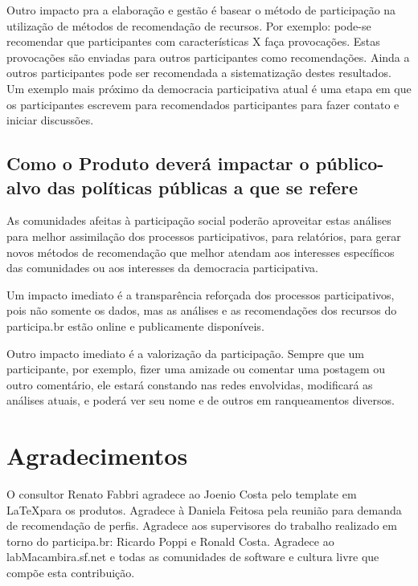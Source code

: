 \documentclass[12pt]{article}
\begin{document}
Outro impacto pra a elaboração e gestão é basear o método de participação na utilização de métodos de recomendação de recursos. Por exemplo: pode-se recomendar que participantes com características X faça provocações. Estas provocações são enviadas para outros participantes como recomendações. Ainda a outros participantes pode ser recomendada a sistematização destes resultados. Um exemplo mais próximo da democracia participativa atual é uma etapa em que os participantes escrevem para recomendados participantes para fazer contato e iniciar discussões.

\subsection{Como o Produto deverá impactar o público-alvo das políticas públicas a que se refere}
As comunidades afeitas à participação social poderão aproveitar estas análises para melhor assimilação dos processos participativos, para relatórios, para gerar novos métodos de recomendação que melhor atendam aos interesses específicos das comunidades ou aos interesses da democracia participativa.

Um impacto imediato é a transparência reforçada dos processos participativos, pois não somente os dados, mas as análises e as recomendações dos recursos do participa.br estão online e publicamente disponíveis.

Outro impacto imediato é a valorização da participação. Sempre que um participante, por exemplo, fizer uma amizade ou comentar uma postagem ou outro comentário, ele estará constando nas redes envolvidas, modificará as análises atuais, e poderá ver seu nome e de outros em ranqueamentos diversos.

\section{Agradecimentos}
O consultor Renato Fabbri agradece ao Joenio Costa pelo template em \LaTeX para os produtos. Agradece à Daniela Feitosa pela reunião para demanda de recomendação de perfis. Agradece aos supervisores do trabalho realizado em torno do participa.br: Ricardo Poppi e Ronald Costa. Agradece ao labMacambira.sf.net e todas as comunidades de software e cultura livre que compõe esta contribuição.
\newpage

\newpage

\newpage
\printindex
\newpage
%
\appendix
\end{document}

